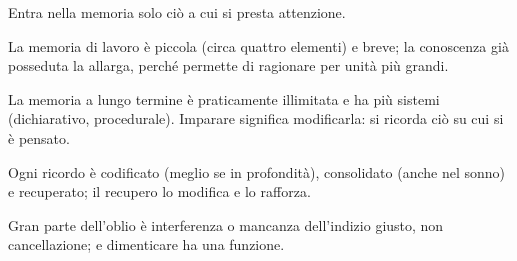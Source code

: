 \begin{sintesi}
  \item Entra nella memoria solo ciò a cui si presta attenzione.
  \item La memoria di lavoro è piccola (circa quattro elementi) e
        breve; la conoscenza già posseduta la allarga, perché permette
        di ragionare per unità più grandi.
  \item La memoria a lungo termine è praticamente illimitata e ha più
        sistemi (dichiarativo, procedurale). Imparare significa
        modificarla: si ricorda ciò su cui si è pensato.
  \item Ogni ricordo è codificato (meglio se in profondità),
        consolidato (anche nel sonno) e recuperato; il recupero lo
        modifica e lo rafforza.
  \item Gran parte dell'oblio è interferenza o mancanza dell'indizio
        giusto, non cancellazione; e dimenticare ha una funzione.
\end{sintesi}

\finecapitolo
